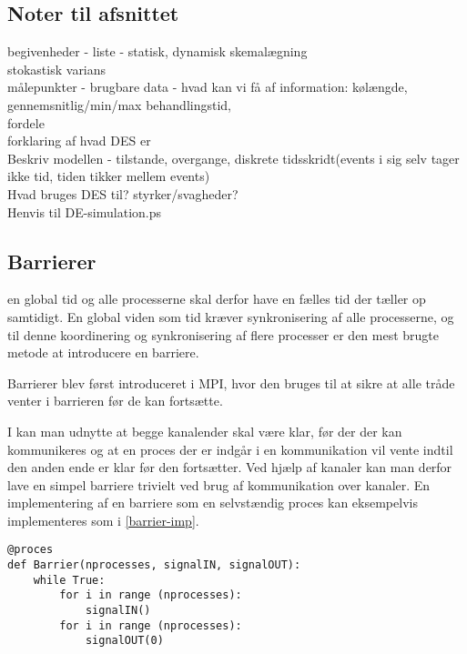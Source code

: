 \subsection*{Noter til afsnittet}
begivenheder - liste - statisk, dynamisk skemalægning \\
stokastisk varians\\
målepunkter - brugbare data - hvad kan vi få af information: kølængde, gennemsnitlig/min/max behandlingstid, \\
fordele\\
forklaring af hvad DES er\\
Beskriv modellen - tilstande, overgange, diskrete tidsskridt(events i sig selv tager ikke tid, tiden tikker mellem events)\\
Hvad bruges DES til? styrker/svagheder?\\
Henvis til DE-simulation.ps\\

\subsection{Barrierer} \label{sec:barrierer}
  en 
global tid og alle processerne skal derfor have en fælles tid der tæller op 
samtidigt.  En global viden som tid kræver synkronisering af alle 
processerne, og til denne koordinering og synkronisering af flere 
processer er den mest brugte metode at introducere en barriere.

Barrierer blev først introduceret i MPI, hvor den bruges til at 
sikre at alle tråde venter i barrieren før de kan fortsætte. 

I  kan man udnytte at begge 
kanalender skal være klar, før der der kan kommunikeres og at en proces der er 
indgår i en kommunikation vil vente indtil den anden ende er klar før den 
fortsætter.  Ved hjælp af kanaler kan man derfor lave en simpel barriere 
trivielt ved brug af kommunikation over kanaler.  En implementering af en 
barriere som en selvstændig proces kan eksempelvis implementeres som i 
\cref{barrier-imp}.

\begin{lstlisting}[float, label=barrier-imp,caption=En barriere i \pycsp]
@proces
def Barrier(nprocesses, signalIN, signalOUT):
	while True:
		for i in range (nprocesses):
			signalIN()
		for i in range (nprocesses):
			signalOUT(0)
\end{lstlisting}

